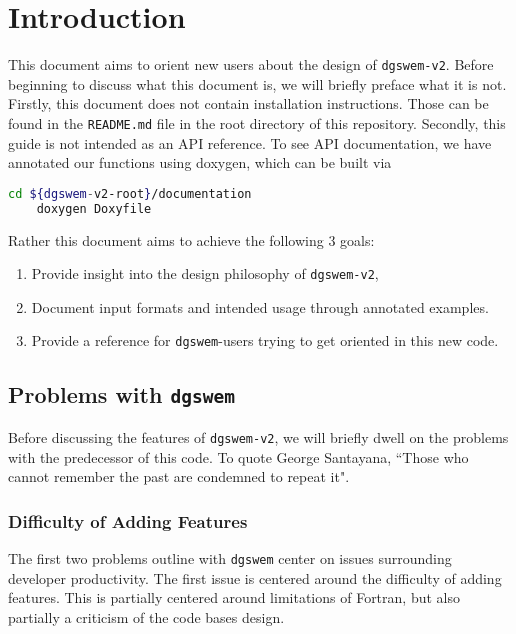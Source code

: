 \chapter{Introduction}

This document aims to orient new users about the design of \texttt{dgswem-v2}. Before beginning to discuss what this document is, we will briefly preface what it is not. Firstly, this document does not contain installation instructions. Those can be found in the \texttt{README.md} file in the root directory of this repository. Secondly, this guide is not intended as an API reference. To see API documentation, we have annotated our functions using doxygen, which can be built via

\begin{lstlisting}[language=bash]
    cd ${dgswem-v2-root}/documentation
    doxygen Doxyfile
\end{lstlisting}

Rather this document aims to achieve the following 3 goals:
\begin{enumerate}
\item Provide insight into the design philosophy of \texttt{dgswem-v2},
\item Document input formats and intended usage through annotated examples.
\item Provide a reference for \texttt{dgswem}-users trying to get oriented in this new code.
\end{enumerate}

\section{Problems with \texttt{dgswem}}
Before discussing the features of \texttt{dgswem-v2}, we will briefly dwell on the problems with the predecessor of this code. To quote George Santayana, ``Those who cannot remember the past are condemned to repeat it".

\subsection{Difficulty of Adding Features}
The first two problems outline with \texttt{dgswem} center on issues surrounding developer productivity. The first issue is centered around the difficulty of adding features. This is partially centered around limitations of Fortran, but also partially a criticism of the code bases design.

